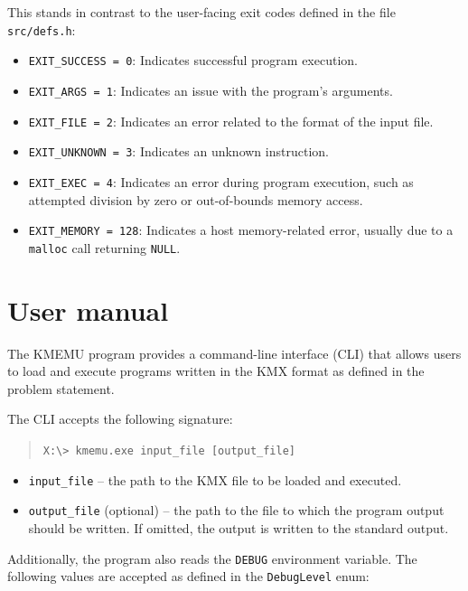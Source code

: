\documentclass[10pt,a4paper,final]{article}
\newcommand{\code}[1]{\texttt{#1}}
\begin{document}
This stands in contrast to the user-facing exit codes defined in the file
\code{src/defs.h}:

\begin{itemize}
    \item \code{EXIT_SUCCESS = 0}: Indicates successful program execution.
    \item \code{EXIT_ARGS = 1}: Indicates an issue with the program's arguments.
    \item \code{EXIT_FILE = 2}: Indicates an error related to the format of the
        input file.
    \item \code{EXIT_UNKNOWN = 3}: Indicates an unknown instruction.
    \item \code{EXIT_EXEC = 4}: Indicates an error during program execution,
        such as attempted division by zero or out-of-bounds memory access.
    \item \code{EXIT_MEMORY = 128}: Indicates a host memory-related error,
        usually due to a \code{malloc} call returning \code{NULL}.
\end{itemize}

\section{User manual}
\label{sec:manual}

The KMEMU program provides a command-line interface (CLI) that allows users to
load and execute programs written in the KMX format as defined in the problem
statement. 

The CLI accepts the following signature:

\begin{quotation}
\code{X:\textbackslash> kmemu.exe \textlangle input_file\textrangle\ 
[\textlangle output_file\textrangle]}
\end{quotation}


\begin{itemize}
    \item \code{\textlangle input_file\textrangle} -- the path to the KMX file to
        be loaded and executed. 
    \item \code{\textlangle output_file\textrangle} (optional) -- the path to the
        file to which the program output should be written. If omitted, the
        output is written to the standard output.
\end{itemize}

Additionally, the program also reads the \code{DEBUG} environment variable. The
following values are accepted as defined in the \code{DebugLevel} enum:
\end{document}
